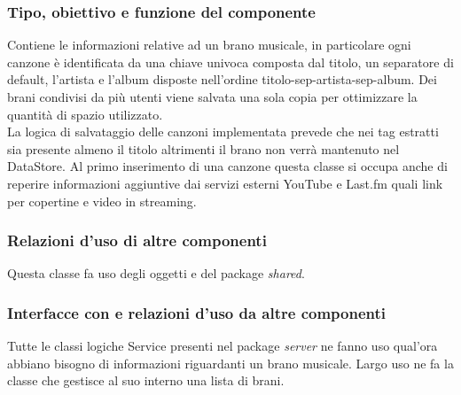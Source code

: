 \subsubsection*{Tipo, obiettivo e funzione del componente} Contiene le
informazioni relative ad un brano musicale, in particolare ogni canzone \`e
identificata da una chiave univoca composta dal titolo, un separatore di
default, l'artista e l'album disposte nell'ordine titolo-sep-artista-sep-album.
Dei brani condivisi da pi\`u utenti viene salvata una sola copia per ottimizzare
la quantit\`a di spazio utilizzato.\\
La logica di salvataggio delle canzoni implementata prevede che nei tag estratti
sia presente almeno il titolo altrimenti il brano non verrà mantenuto nel
DataStore. Al primo inserimento di una canzone questa classe si occupa anche di
reperire informazioni aggiuntive dai servizi esterni YouTube e Last.fm quali link per copertine e video in streaming. \subsubsection*{Relazioni d'uso di altre componenti} Questa classe fa uso degli
oggetti  e  del package \emph{shared}. 
\subsubsection*{Interfacce con e relazioni d'uso da altre componenti} Tutte le classi logiche Service presenti nel package
\emph{server} ne fanno uso qual'ora abbiano bisogno di informazioni riguardanti
un brano musicale. Largo uso ne fa la classe  che gestisce al
suo interno una lista di brani. 
